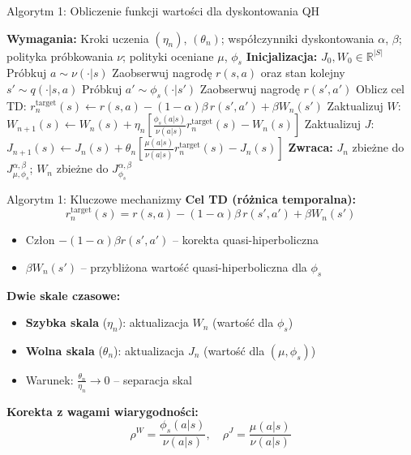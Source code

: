 \documentclass[aspectratio=169]{beamer}
\begin{document}
\begin{frame}{Algorytm 1: Obliczenie funkcji wartości dla dyskontowania QH}
\begin{algorithm}[H]
\caption{Obliczenie funkcji wartości dla dyskontowania QH \cite{eshwar2025}}
\label{alg:policy-eval-defense}
\begin{algorithmic}[1]
\small
\STATE \textbf{Wymagania:} Kroki uczenia $(\eta_n)$, $(\theta_n)$; współczynniki dyskontowania $\alpha$, $\beta$; polityka próbkowania $\nu$; polityki oceniane $\mu$, $\phi_s$
\STATE \textbf{Inicjalizacja:} $J_0, W_0 \in \mathbb{R}^{|S|}$
\STATE Próbkuj $a \sim \nu(\cdot|s)$
\STATE Zaobserwuj nagrodę $r(s, a)$ oraz stan kolejny $s' \sim q(\cdot|s, a)$
\STATE Próbkuj $a' \sim \phi_s(\cdot|s')$
\STATE Zaobserwuj nagrodę $r(s', a')$
\STATE Oblicz cel TD: $r^{\text{target}}_n(s) \leftarrow r(s, a) - (1 - \alpha)\beta \, r(s', a') + \beta W_n(s')$
\STATE Zaktualizuj $W$: $W_{n+1}(s) \leftarrow W_n(s) + \eta_n \left[ \frac{\phi_s(a|s)}{\nu(a|s)} r^{\text{target}}_n(s) - W_n(s) \right]$
\STATE Zaktualizuj $J$: $J_{n+1}(s) \leftarrow J_n(s) + \theta_n \left[ \frac{\mu(a|s)}{\nu(a|s)} r^{\text{target}}_n(s) - J_n(s) \right]$
\ENDFOR
\ENDFOR
\STATE \textbf{Zwraca:} $J_n$ zbieżne do $J^{\alpha, \beta}_{\mu, \phi_s}$; $W_n$ zbieżne do $J^{\alpha, \beta}_{\phi_s}$
\end{algorithmic}
\end{algorithm}
\end{frame}

\begin{frame}{Algorytm 1: Kluczowe mechanizmy}
\textbf{Cel TD (różnica temporalna):}
\[
r^{\text{target}}_n(s) = r(s,a) - (1-\alpha)\beta \, r(s',a') + \beta W_n(s')
\]

\begin{itemize}
    \item Człon $-(1-\alpha)\beta r(s',a')$ -- korekta quasi-hiperboliczna
    \item $\beta W_n(s')$ -- przybliżona wartość quasi-hiperboliczna dla $\phi_s$
\end{itemize}

\vspace{0.5em}
\textbf{Dwie skale czasowe:}
\begin{itemize}
    \item \textbf{Szybka skala} ($\eta_n$): aktualizacja $W_n$ (wartość dla $\phi_s$)
    \item \textbf{Wolna skala} ($\theta_n$): aktualizacja $J_n$ (wartość dla $(\mu, \phi_s)$)
    \item Warunek: $\frac{\theta_n}{\eta_n} \to 0$ -- separacja skal
\end{itemize}

\vspace{0.5em}
\textbf{Korekta z wagami wiarygodności:}
\[
\rho^W = \frac{\phi_s(a|s)}{\nu(a|s)}, \quad \rho^J = \frac{\mu(a|s)}{\nu(a|s)}
\]
\end{frame}
\end{document}
